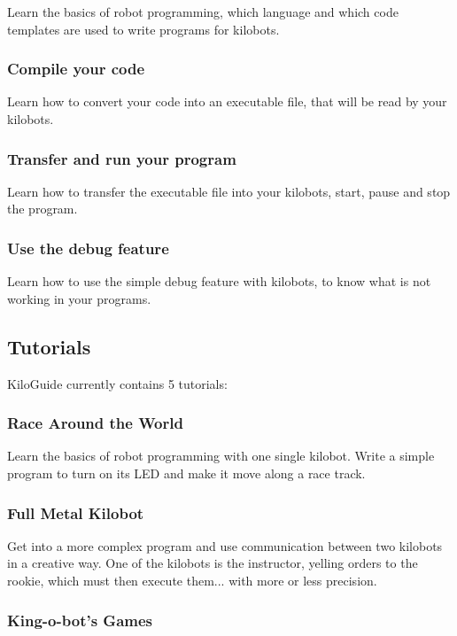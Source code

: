 \documentclass[a4paper,12pt,titlepage]{scrartcl}
\begin{document}
Learn the basics of robot programming, which language and which code templates are used to write programs for kilobots.

\subsubsection{Compile your code}

Learn how to convert your code into an executable file, that will be read by your kilobots.

\subsubsection{Transfer and run your program}

Learn how to transfer the executable file into your kilobots, start, pause and stop the program.

\subsubsection{Use the debug feature}

Learn how to use the simple debug feature with kilobots, to know what is not working in your programs.

\subsection{Tutorials}

KiloGuide currently contains 5 tutorials:

\subsubsection{Race Around the World}

Learn the basics of robot programming with one single kilobot. Write a simple program to turn on its LED and make it move along a race track.

\subsubsection{Full Metal Kilobot}

Get into a more complex program and use communication between two kilobots in a creative way. One of the kilobots is the instructor, yelling orders to the rookie, which must then execute them... with more or less precision.

\subsubsection{King-o-bot's Games}
\end{document}
